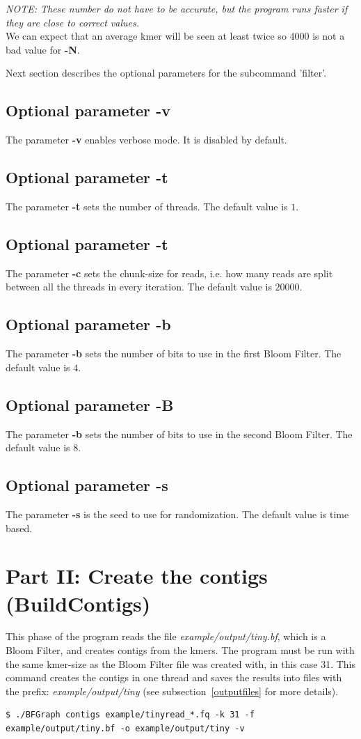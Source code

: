 \documentclass[a4paper]{report}
\renewcommand{\b}[1]{\textbf{#1}}  %
\newcommand{\e}[1]{\emph{#1}}    %
\begin{document}
\textit{NOTE: These number do not have to be accurate, but the program runs faster if they are close to correct values.} \\[4pt]

We can expect that an average kmer will be seen at least twice so $4000$ is not a bad value for \b{-N}.

Next section describes the optional parameters for the subcommand 'filter'.

\subsection{Optional parameter \b{-v}}
The parameter \b{-v} enables verbose mode. It is disabled by default.
\subsection{Optional parameter \b{-t}}
The parameter \b{-t} sets the number of threads. The default value is $1$.
\subsection{Optional parameter \b{-t}}
The parameter \b{-c} sets the chunk-size for reads, i.e. how many reads are split between all the threads in every iteration. 
The default value is $20000$.
\subsection{Optional parameter \b{-b}}
The parameter \b{-b} sets the number of bits to use in the first Bloom Filter. 
The default value is $4$.
\subsection{Optional parameter \b{-B}}
The parameter \b{-b} sets the number of bits to use in the second Bloom Filter. 
The default value is $8$.
\subsection{Optional parameter \b{-s}}
The parameter \b{-s} is the seed to use for randomization. The default value is time based.

\newpage
\section{Part II: Create the contigs (BuildContigs)}
This phase of the program reads the file \e{example/output/tiny.bf}, which is a Bloom Filter, and creates contigs from the kmers. 
The program must be run with the same kmer-size as the Bloom Filter file was created with, in this case 31.
This command creates the contigs in one thread and saves the results into files with the prefix: \e{example/output/tiny} (see
subsection~\ref{outputfiles} for more details).
\footnotesize
\begin{verbatim}
$ ./BFGraph contigs example/tinyread_*.fq -k 31 -f example/output/tiny.bf -o example/output/tiny -v
\end{verbatim}
\normalsize
\end{document}
